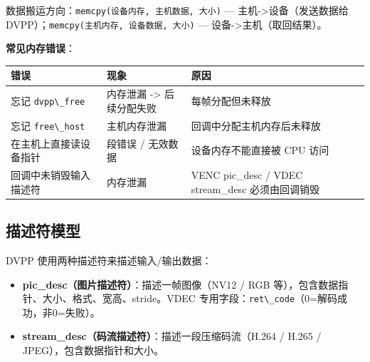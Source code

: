 数据搬运方向：\passthrough{\lstinline!memcpy(设备内存, 主机数据, 大小)!}
--- 主机-\textgreater 设备（发送数据给
DVPP）；\passthrough{\lstinline!memcpy(主机内存, 设备数据, 大小)!} ---
设备-\textgreater 主机（取回结果）。

\textbf{常见内存错误}：

\begin{longtable}[]{@{}
  >{\raggedright\arraybackslash}p{}
  >{\raggedright\arraybackslash}p{}
  >{\raggedright\arraybackslash}p{}@{}}
\toprule\noalign{}
\begin{minipage}[b]{\linewidth}\raggedright
错误
\end{minipage} & \begin{minipage}[b]{\linewidth}\raggedright
现象
\end{minipage} & \begin{minipage}[b]{\linewidth}\raggedright
原因
\end{minipage} \\
\midrule\noalign{}
\endhead
\bottomrule\noalign{}
\endlastfoot
忘记 \passthrough{\lstinline!dvpp\_free!} & 内存泄漏 -\textgreater{}
后续分配失败 & 每帧分配但未释放 \\
忘记 \passthrough{\lstinline!free\_host!} & 主机内存泄漏 &
回调中分配主机内存后未释放 \\
在主机上直接读设备指针 & 段错误 / 无效数据 & 设备内存不能直接被 CPU
访问 \\
回调中未销毁输入描述符 & 内存泄漏 & VENC pic\_desc / VDEC stream\_desc
必须由回调销毁 \\
\end{longtable}

\subsection{描述符模型}\label{src-book-chapter6-h5}

DVPP 使用两种描述符来描述输入/输出数据：

\begin{itemize}
\tightlist
\item
  \textbf{pic\_desc（图片描述符）}：描述一帧图像（NV12 / RGB
  等），包含数据指针、大小、格式、宽高、stride。VDEC
  专用字段：\passthrough{\lstinline!ret\_code!}（0=解码成功，非0=失败）。
\item
  \textbf{stream\_desc（码流描述符）}：描述一段压缩码流（H.264 / H.265 /
  JPEG），包含数据指针和大小。
\end{itemize}

